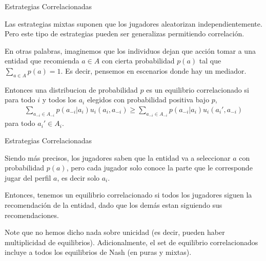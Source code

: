 \documentclass[notes, 11pt]{beamer} %
\newenvironment{wideitemize}{\itemize\addtolength{\itemsep}{10pt}}{\enditemize}
\begin{document}
\begin{frame}{Estrategias Correlacionadas}
\begin{wideitemize}
	\item<1-> Las estrategias mixtas suponen que los jugadores aleatorizan independientemente. Pero este tipo de estrategias pueden ser generalizas permitiendo correlaci\'on.
	\item<2-> En otras palabras, imaginemos que los individuos dejan que acci\'on tomar a una entidad que recomienda $a \in A$ con cierta probabilidad $p(a)$ tal que $\sum_{ a \in A } p(a) = 1$. Es decir, pensemos en escenarios donde hay un mediador.
	\item<3-> Entonces una distribucion de probabilidad $p$ es un equilibrio correlacionado si para todo $i$ y todos los $a_{i}$ elegidos con probabilidad positiva bajo $p$,
	\begin{align*}
		\sum_{a_{-i} \in A_{-i}}p(a_{-i}|a_{i})u_{i}(a_{i},a_{-i}) \geq \sum_{a_{-i} \in A_{-i}}p(a_{-i}|a_{i})u_{i}(a_{i}',a_{-i})
	\end{align*} para todo $a_{i}' \in A_{i}$.
\end{wideitemize}
\end{frame}

\begin{frame}{Estrategias Correlacionadas}
\begin{wideitemize}
	\item<1-> Siendo m\'as precisos, los jugadores saben que la entidad va a seleccionar $a$ con probabilidad $p(a)$, pero cada jugador solo conoce la parte que le corresponde jugar del perfil $a$, es decir solo $a_{i}$.
	\item<2-> Entonces, tenemos un equilibrio correlacionado si todos los jugadores siguen la recomendaci\'on de la entidad, dado que los dem\'as estan siguiendo sus recomendaciones.
	\item<3-> Note que no hemos dicho nada sobre unicidad (es decir, pueden haber multiplicidad de equilibrios). Adicionalmente, el set de equilibrio correlacionados incluye a todos los equilibrios de Nash (en puras y mixtas).
\end{wideitemize}
\end{frame}
\end{document}
